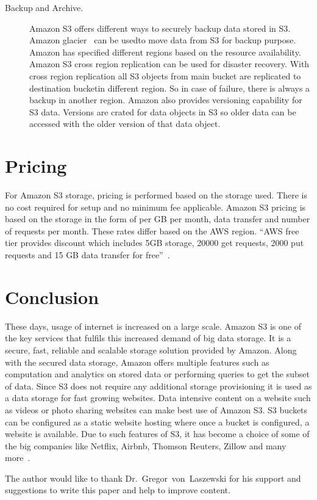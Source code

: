 \begin{description}
\item [Backup and Archive.] Amazon S3 offers different ways to securely backup
data stored in S3. Amazon glacier~\cite{hid-sp18-420-amazon-glacier} can be
usedto move data from S3 for backup purpose. Amazon has
specified different regions based on the resource availability. Amazon S3 cross
region replication can be used for disaster recovery. With cross region
replication all S3 objects from main bucket are replicated to destination
bucketin different region. So in case of failure, there is always a backup in
another region. 
Amazon also provides versioning capability for S3 data. Versions are
crated for data objects in S3 so older data can be accessed with the older
version of that data object.

\end{description}

\section{Pricing}

For Amazon S3 storage, pricing is performed based on the storage used. There is
no cost required for setup and no minimum fee applicable. Amazon S3 pricing is
based on the storage in the form of per GB per month, data transfer and number
of requests per month. These rates differ based on the AWS region. ``AWS free
tier provides discount which includes 5GB storage, 20000 get requests, 2000 put
requests and 15 GB data transfer for
free''~\cite{hid-sp18-420-amazon-S3-pricing}.

\section{Conclusion}
These days, usage of internet is increased on a large scale.
Amazon S3 is one of the key services that fulfils this increased demand of big
data storage. It is a secure, fast, reliable and scalable storage
solution provided by Amazon.
Along with the secured data storage, Amazon offers multiple features such as
computation and analytics on stored data or performing queries to get the
subset of data.
Since S3 does not require any additional storage provisioning it is used as a
data storage for fast growing websites. Data intensive content on a website
such as videos or photo sharing websites can make best use of Amazon S3.
S3 buckets can be configured as a static website hosting where once a bucket is
configured, a website is available.
Due to such features of S3, it has become a choice of some of the big companies
like Netflix, Airbnb, Thomson Reuters, Zillow and many
more~\cite{hid-sp18-420-amazon-S3}.

\begin{acks}

The author would like to thank Dr.~Gregor~von~Laszewski for his support and
suggestions to write this paper and help to improve content.

\end{acks}



 
